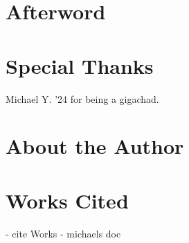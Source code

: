 \chapter{Afterword}

\chapter{Special Thanks}

Michael Y. '24 for being a gigachad.

\chapter{About the Author}

\chapter{Works Cited}
- cite Works
- michaels doc